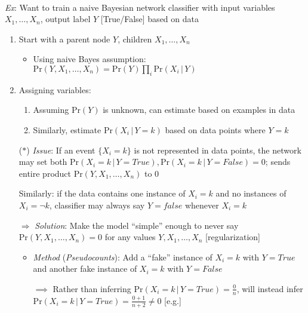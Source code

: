 \documentclass[12pt]{extarticle}
\theoremstyle{definition}
\theoremstyle{remark}
\newcommand{\pstart}[0]{\noindent}
\newcommand{\newp}[0]{~\\ \pstart}
\newcommand{\prob}[1]{\text{Pr}(#1)}
\newcommand{\cond}[2]{#1\,\vert\,#2}
\begin{document}
\newp
\textit{Ex}: Want to train a naive Bayesian network classifier with input variables $X_1,\hdots, X_n$, output label $Y$ [True/False] based on data \begin{enumerate}
    \item Start with a parent node $Y$, children $X_1,\hdots, X_n$ \begin{itemize}
        \item Using naive Bayes assumption: $\prob{Y,X_1,\hdots,X_n}=\prob{Y}\prod_i\prob{\cond{X_i}{Y}}$
    \end{itemize}
    \item Assigning variables: \begin{enumerate}
        \item Assuming $\prob{Y}$ is unknown, can estimate based on examples in data
        \item Similarly, estimate $\prob{\cond{X_i}{Y=k}}$ based on data points where $Y=k$
    \end{enumerate}
    \item[($\ast$)]\textit{Issue}: If an event $\{X_i=k\}$ is not represented in data points, the network may set both $\prob{\cond{X_i=k}{Y=True}},\prob{\cond{X_i=k}{Y=False}}=0$; sends entire product $\prob{Y,X_1,\hdots,X_n}$ to 0

    Similarly: if the data contains one instance of $X_i=k$ and no instances of $X_i=\neg k$, classifier may always say $Y=false$ whenever $X_i=k$

    $\Rightarrow$ \textit{Solution}: Make the model ``simple'' enough to never say $\prob{Y,X_1,\hdots,X_n}=0$ for any values $Y,X_1,\hdots, X_n$ [regularization]  \begin{itemize}
        \item \textit{Method} (\textit{Pseudocounts}): Add a ``fake'' instance of $X_i=k$ with $Y=True$ and another fake instance of $X_i=k$ with $Y=False$

        $\implies$ Rather than inferring $\prob{\cond{X_i=k}{Y=True}}=\frac{0}{n}$, will instead infer $\prob{\cond{X_i=k}{Y=True}}=\frac{0+1}{n+2}\neq 0$ [e.g.]
    \end{itemize}
\end{enumerate}
\end{document}

